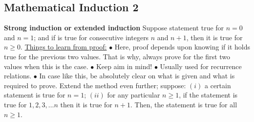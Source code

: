 \documentclass{article}
\begin{document}
\subsection{Mathematical Induction 2}
\textbf{Strong induction or extended induction}
\newline
\newline
Suppose statement true for $n = 0$ and $n = 1$; and if is true for consecutive integers $n$ and $n + 1$, then it is true for $n \geq 0$.
\newline
{}
\newline
\newline
\underline{Things to learn from proof:}
\newline
$\bullet $ Here, proof depends upon knowing if it holds true for the previous two values. That is why, always prove for the first two values when this is the case.
\newline
$\bullet $ Keep aim in mind!
\newline
$\bullet $ Usually used for recurrence relations.
\newline
$\bullet $ In case like this, be absolutely clear on what is given and what is required to prove.
\newline 
Extend the method even further; suppose:
\newline
$(i) $ a certain statement is true for $n = 1$;
\newline
$(ii) $ for any particular $n \geq 1$, if the statement is true for $1, 2, 3, \dots n$ then it is true for $n + 1$.
\newline
Then, the statement is true for all $n \geq 1$.
\newline
{}
\newpage
\end{document}
